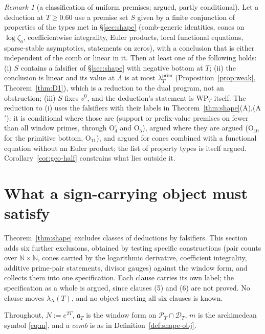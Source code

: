 \documentclass[11pt]{amsart}
\theoremstyle{definition}
\theoremstyle{remark}
\newtheorem{remark}[theorem]{Remark}
\newcommand{\N}{\mathbb N}
\newcommand{\PT}{\mathcal P_T}
\newcommand{\lamP}{\lambda^{\mathrm{prim}}_T}
\newcommand{\lamA}{\lambda_{\mathrm A}(T)}
\begin{document}
\begin{remark}[a classification of uniform premises; argued, partly conditional]\label{rem:geo-trich}
Let a deduction at $T\ge0.60$ use a premise set $S$ given by a finite conjunction of properties of the types met in
\S\ref{sec:shape} (comb-generic identities, cones on $\log\zeta_a$, coefficientwise integrality, Euler products, local functional
equations, sparse-stable asymptotics, statements on zeros), with a conclusion that is either independent of the comb or linear in it.
Then at least one of the following holds: (i) $S$ contains a falsifier of \S\ref{sec:shape} with negative bottom at $T$; (ii) the
conclusion is linear and its value at $\Lambda$ is at most $\lamP$ (Proposition~\ref{prop:weak}, Theorem~\ref{thm:D1}), which is a
reduction to the dual program, not an obstruction; (iii) $S$ fixes $v^0$, and the deduction's statement is $\mathrm{WP}_T$ itself. The
reduction to (i) uses the falsifiers with their labels in Theorem~\ref{thm:shape}(A),(A$'$): it is conditional where those are
(support or prefix-value premises on fewer than all window primes, through $\mathrm O_4^\varepsilon$ and $\mathrm O_5$), argued where
they are argued ($\mathrm O_{10}$ for the primitive bottom, $\mathrm O_{11}$), and argued for cones combined with a functional equation
without an Euler product; the list of property types is itself argued. Corollary~\ref{cor:geo-half} constrains what lies outside it.
\end{remark}

\section{What a sign-carrying object must satisfy}\label{sec:spec}

Theorem~\ref{thm:shape} excludes classes of deductions by falsifiers. This section adds six further exclusions, obtained by testing
specific constructions (pair counts over $\N\times\N$, cones carried by the logarithmic derivative, coefficient integrality, additive
prime-pair statements, divisor gauges) against the window form, and collects them into one specification. Each clause carries its own
label; the specification as a whole is argued, since clauses (5) and (6) are not proved. No clause moves $\lamA$, and no object meeting
all six clauses is known.

Throughout, $N:=e^{2T}$, $\mathfrak a_T$ is the window form on $\PT\cap\mathcal D_T$, $m$ is the archimedean symbol \eqref{eq:m}, and a
\emph{comb} is as in Definition~\ref{def:shape-obj}.
\end{document}
